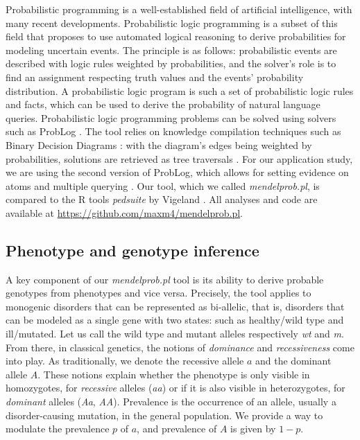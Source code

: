\documentclass{eptcs}
\begin{document}
Probabilistic programming is a well-established field of artificial intelligence, with many recent developments. Probabilistic logic programming is a subset of this field that proposes to use automated logical reasoning to derive probabilities for modeling uncertain events. The principle is as follows: probabilistic events are described with logic rules weighted by probabilities, and the solver's role is to find an assignment respecting truth values and the events' probability distribution. A probabilistic logic program is such a set of probabilistic logic rules and facts, which can be used to derive the probability of natural language queries. Probabilistic logic programming problems can be solved using solvers such as ProbLog \cite{de_raedt_problog_2007}. The tool relies on knowledge compilation techniques such as Binary Decision Diagrams \cite{bryant_graph-based_1986}: with the diagram's edges being weighted by probabilities, solutions are retrieved as tree traversals \cite{de_raedt_problog_2007}. For our application study, we are using the second version of ProbLog, which allows for setting evidence on atoms and multiple querying \cite{dries_problog2_2015, fierens_inference_2015}. Our tool, which we called \textit{mendelprob.pl}, is compared to the R tools \textit{pedsuite} by Vigeland \cite{vigeland_pedigree_2021}. All analyses and code are available at \href{https://github.com/maxm4/mendelprob.pl}{https://github.com/maxm4/mendelprob.pl}. %

\subsection*{Phenotype and genotype inference}

A key component of our \textit{mendelprob.pl} tool is its ability to derive probable genotypes from phenotypes and vice versa. Precisely, the tool applies to monogenic disorders that can be represented as bi-allelic, that is, disorders that can be modeled as a single gene with two states: such as healthy/wild type and ill/mutated. Let us call the wild type and mutant alleles respectively \textit{wt} and \textit{m}. From there, in classical genetics, the notions of \textit{dominance} and \textit{recessiveness} come into play. As traditionally, we denote the recessive allele $a$ and the dominant allele $A$. These notions explain whether the phenotype is only visible in homozygotes, for \textit{recessive} alleles (\textit{aa}) or if it is also visible in heterozygotes, for \textit{dominant} alleles (\textit{Aa}, \textit{AA}). Prevalence is the occurrence of an allele, usually a disorder-causing mutation, in the general population. We provide a way to modulate the prevalence $p$ of $a$, and prevalence of $A$ is given by $1-p$. %
\end{document}
